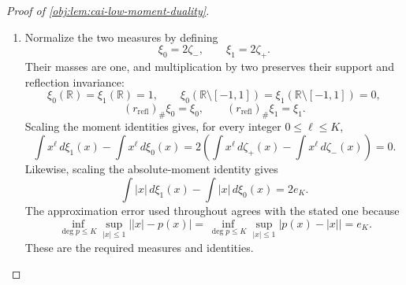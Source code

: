 \begin{proof}[Proof of \cref{obj:lem:cai-low-moment-duality}]
\begin{enumerate}
\item Normalize the two measures by defining
\[
\xi_0=2\zeta_-,\qquad \xi_1=2\zeta_+.
\]
Their masses are one, and multiplication by two preserves their support and reflection invariance:
\[
\xi_0(\mathbb R)=\xi_1(\mathbb R)=1,\qquad
\xi_0(\mathbb R\setminus[-1,1])
=\xi_1(\mathbb R\setminus[-1,1])=0,
\]
\[
(r_{\mathrm{refl}})_\#\xi_0=\xi_0,\qquad
(r_{\mathrm{refl}})_\#\xi_1=\xi_1.
\]
Scaling the moment identities gives, for every integer \(0\le\ell\le K\),
\[
\int x^\ell\,d\xi_1(x)-\int x^\ell\,d\xi_0(x)
=2\left(\int x^\ell\,d\zeta_+(x)-\int x^\ell\,d\zeta_-(x)\right)
=0.
\]
Likewise, scaling the absolute-moment identity gives
\[
\int |x|\,d\xi_1(x)-\int |x|\,d\xi_0(x)=2e_K.
\]
The approximation error used throughout agrees with the stated one because
\[
\inf_{\deg p\le K}\sup_{|x|\le1}\bigl||x|-p(x)\bigr|
=
\inf_{\deg p\le K}\sup_{|x|\le1}\bigl|p(x)-|x|\bigr|
=e_K.
\]
These are the required measures and identities.
\end{enumerate}
\end{proof}
